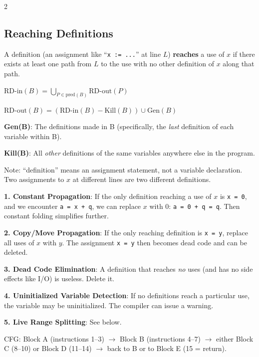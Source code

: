 \documentclass[9pt,landscape]{extarticle}
\begin{document}
\begin{multicols}{2}
\subsection{Reaching Definitions}

A definition (an assignment like ``\texttt{x := ...}'' at line $L$) \textbf{reaches} a use of $x$ if there exists at least one path from $L$ to the use with no other definition of $x$ along that path.

$\text{RD-in}(B) = \displaystyle\bigcup_{P \in \text{pred}(B)} \text{RD-out}(P)$

$\text{RD-out}(B) = (\text{RD-in}(B) - \text{Kill}(B)) \cup \text{Gen}(B)$

\textbf{Gen(B)}: The definitions made in B (specifically, the \emph{last} definition of each variable within B).

\textbf{Kill(B)}: All \emph{other} definitions of the same variables anywhere else in the program.

Note: ``definition'' means an assignment statement, not a variable declaration. Two assignments to $x$ at different lines are two different definitions.

\begin{exambox}
\textbf{1. Constant Propagation}: If the only definition reaching a use of $x$ is \texttt{x = 0}, and we encounter \texttt{a = x + q}, we can replace $x$ with 0: \texttt{a = 0 + q = q}. Then constant folding simplifies further.

\textbf{2. Copy/Move Propagation}: If the only reaching definition is \texttt{x = y}, replace all uses of $x$ with $y$. The assignment \texttt{x = y} then becomes dead code and can be deleted.

\textbf{3. Dead Code Elimination}: A definition that reaches \emph{no} uses (and has no side effects like I/O) is useless. Delete it.

\textbf{4. Uninitialized Variable Detection}: If no definitions reach a particular use, the variable may be uninitialized. The compiler can issue a warning.

\textbf{5. Live Range Splitting}: See below.
\end{exambox}

\begin{exambox}
CFG: Block A (instructions 1--3) $\to$ Block B (instructions 4--7) $\to$ either Block C (8--10) or Block D (11--14) $\to$ back to B or to Block E (15 = return).


\end{exambox}
\end{multicols}
\end{document}
